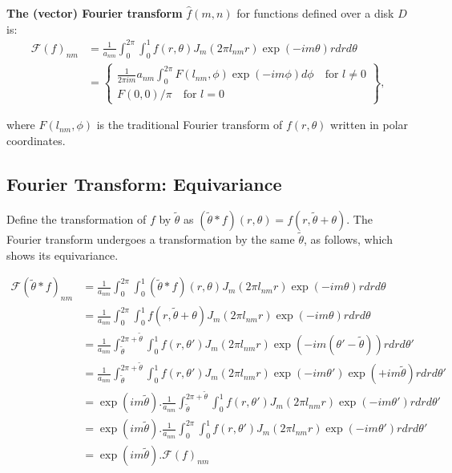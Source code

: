\documentclass{article}
\begin{document}
\textbf{The (vector) Fourier transform} $\hat{f}(m, n)$ for functions defined over a disk $D$ is:
\begin{align*}
  \mathcal{F}(f)_{nm}
    &= \frac{1}{a_{n m}} \int_0^{2 \pi} \int_0^1 f(r, \theta) J_m(2 \pi l_{n m} r) \exp(-i m \theta) r d r d\theta \\
    &=\left\{\begin{array}{c}
\frac{1}{2 \pi i m} a_{n m} \int_0^{2 \pi} F(l_{n m}, \phi) \exp(-i m \phi) d \phi \quad \text{for $l\neq 0$} \\
F(0,0) / \pi \quad \text{for $l = 0$}
\end{array}\right\},
\end{align*}

where $F(l_{n m}, \phi) $ is the traditional Fourier transform of $f(r, \theta)$ written in polar coordinates.

\subsection{Fourier Transform: Equivariance}

Define the transformation of $f$ by $\tilde \theta$ as $(\tilde{\theta} \ast f)(r, \theta) = f(r, \tilde \theta +\theta )$. The Fourier transform undergoes a transformation by the same $\tilde \theta$, as follows, which shows its equivariance.

\begin{align*}
    \mathcal{F}(\tilde{\theta} \ast f)_{nm}
    &= \frac{1}{a_{n m}}
        \int_0^{2 \pi} \int_0^1
            (\tilde{\theta} \ast f)(r, \theta) J_m(2 \pi l_{n m} r) \exp(-i m \theta)
                r dr d\theta \\
    &= \frac{1}{a_{n m}}
        \int_0^{2 \pi} \int_0^1
            f(r, \tilde \theta + \theta) J_m(2 \pi l_{n m} r) \exp(-i m \theta)
                r dr d\theta \\
    &= \frac{1}{a_{n m}}
         \int_{\tilde{\theta}}^{2 \pi+\tilde{\theta}} \int_0^1
            f(r, \theta') J_m(2 \pi l_{n m} r) \exp(-i m (\theta' - \tilde{\theta}))
                r dr d\theta'\\
    &= \frac{1}{a_{n m}}
         \int_{\tilde{\theta}}^{2 \pi+\tilde{\theta}} \int_0^1
            f(r, \theta') J_m(2 \pi l_{n m} r) \exp(-i m \theta')\exp(+im\tilde{\theta})
                r dr d\theta' \\
    &= \exp(im\tilde{\theta}) .\frac{1}{a_{n m}}
         \int_{\tilde{\theta}}^{2 \pi+\tilde{\theta}} \int_0^1
            f(r, \theta') J_m(2 \pi l_{n m} r) \exp(-i m \theta')
                r dr d\theta' \\
    &= \exp(im\tilde{\theta}) .\frac{1}{a_{n m}}
         \int_{0}^{2 \pi} \int_0^1
            f(r, \theta') J_m(2 \pi l_{n m} r) \exp(-i m \theta')
                r dr d\theta' \\
    &= \exp(im\tilde{\theta}) . \mathcal{F}(f)_{nm}
\end{align*}
\end{document}
